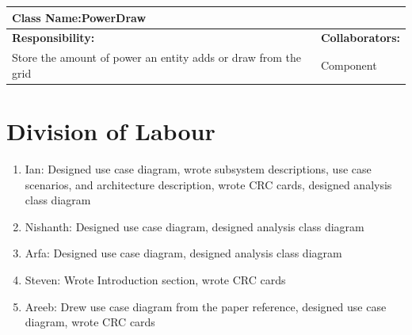 \documentclass[]{article}
\begin{document}
\begin{enumerate}[a)]
\begin{table}[ht]
\begin{tabular}{|p{5cm}|p{5cm}|}
		\hline
		\end{tabular}
	\end{table}
	\begin{table}[ht]
		\centering
		\begin{tabular}{|p{5cm}|p{5cm}|}
		\hline 
		 \multicolumn{2}{|l|}{\textbf{Class Name:}PowerDraw} \\
		\hline
		\textbf{Responsibility:} & \textbf{Collaborators:} \\
		\hline 
		Store the amount of power an entity adds or draw from the grid & Component\\
		\hline
		\end{tabular}
	\end{table}
\end{enumerate}


\appendix
\section{Division of Labour}
\label{sec:division_of_labour}
\begin{enumerate}
	\item Ian: Designed use case diagram, wrote subsystem descriptions, use case scenarios, and architecture description, wrote CRC cards, designed analysis class diagram
	\item Nishanth: Designed use case diagram, designed analysis class diagram
	\item Arfa: Designed use case diagram, designed analysis class diagram
	\item Steven: Wrote Introduction section, wrote CRC cards
	\item Areeb: Drew use case diagram from the paper reference, designed use case diagram, wrote CRC cards
\end{enumerate}
\end{document}
